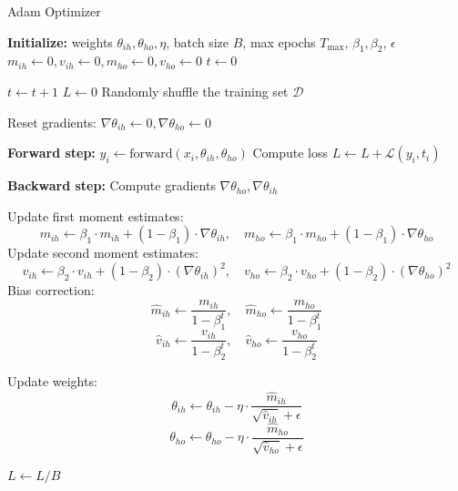 \begin{algorithm}
\caption{Adam Optimizer}
\begin{algorithmic}[1]
\State \textbf{Initialize:} weights \(\theta_{ih}, \theta_{ho}, \eta\), batch size \(B\), max epochs \(T_{\text{max}}\), \(\beta_1, \beta_2\), \(\epsilon\)
\State \(m_{ih} \gets 0, v_{ih} \gets 0, m_{ho} \gets 0, v_{ho} \gets 0\) 
\State \(t \gets 0\) 

\Repeat
    \State \(t \gets t + 1\)
    \State \(L \gets 0\) 
    \State Randomly shuffle the training set \(\mathcal{D}\)

        \State Reset gradients: \(\nabla \theta_{ih} \gets 0, \nabla \theta_{ho} \gets 0\)

            \State \textbf{Forward step:} \(y_i \gets \text{forward}(x_i, \theta_{ih}, \theta_{ho})\)
            \State Compute loss \(L \gets L + \mathcal{L}(y_i, t_i)\)

            \State \textbf{Backward step:} Compute gradients \(\nabla \theta_{ho}, \nabla \theta_{ih}\)
        \EndFor

        \State Update first moment estimates: 
        \[
        m_{ih} \gets \beta_1 \cdot m_{ih} + (1 - \beta_1) \cdot \nabla \theta_{ih}, \quad m_{ho} \gets \beta_1 \cdot m_{ho} + (1 - \beta_1) \cdot \nabla \theta_{ho}
        \]
        \State Update second moment estimates: 
        \[
        v_{ih} \gets \beta_2 \cdot v_{ih} + (1 - \beta_2) \cdot (\nabla \theta_{ih})^2, \quad v_{ho} \gets \beta_2 \cdot v_{ho} + (1 - \beta_2) \cdot (\nabla \theta_{ho})^2
        \]
        \State Bias correction:
        \[
        \hat{m}_{ih} \gets \frac{m_{ih}}{1 - \beta_1^t}, \quad \hat{m}_{ho} \gets \frac{m_{ho}}{1 - \beta_1^t}
        \]
        \[
        \hat{v}_{ih} \gets \frac{v_{ih}}{1 - \beta_2^t}, \quad \hat{v}_{ho} \gets \frac{v_{ho}}{1 - \beta_2^t}
        \]

        \State Update weights: 
        \[
        \theta_{ih} \gets \theta_{ih} - \eta \cdot \frac{\hat{m}_{ih}}{\sqrt{\hat{v}_{ih}} + \epsilon}
        \]
        \[
        \theta_{ho} \gets \theta_{ho} - \eta \cdot \frac{\hat{m}_{ho}}{\sqrt{\hat{v}_{ho}} + \epsilon}
        \]

        \State \(L \gets L / B\) 
    \EndFor


\end{algorithmic}
\end{algorithm}

